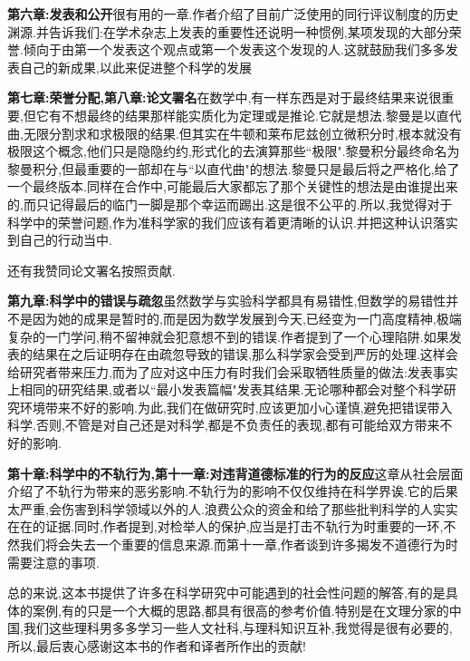 \documentclass[b5paper]{ctexart}
\begin{document}
\textbf{第六章:发表和公开}很有用的一章.作者介绍了目前广泛使用的同行评议制度的历史渊源.并告诉我们:在学术杂志上发表的重要性还说明一种惯例,某项发现的大部分荣誉.倾向于由第一个发表这个观点或第一个发表这个发现的人.这就鼓励我们多多发表自己的新成果,以此来促进整个科学的发展\par
\textbf{第七章:荣誉分配,第八章:论文署名}在数学中,有一样东西是对于最终结果来说很重要,但它有不想最终的结果那样能实质化为定理或是推论.它就是想法.黎曼是以直代曲,无限分割求和求极限的结果.但其实在牛顿和莱布尼兹创立微积分时,根本就没有极限这个概念,他们只是隐隐约约,形式化的去演算那些``极限".黎曼积分最终命名为黎曼积分,但最重要的一部却在与``以直代曲"的想法.黎曼只是最后将之严格化,给了一个最终版本.同样在合作中,可能最后大家都忘了那个关键性的想法是由谁提出来的,而只记得最后的临门一脚是那个幸运而踢出.这是很不公平的.所以,我觉得对于科学中的荣誉问题,作为准科学家的我们应该有着更清晰的认识.并把这种认识落实到自己的行动当中.\par
还有我赞同论文署名按照贡献.\par
\textbf{第九章:科学中的错误与疏忽}虽然数学与实验科学都具有易错性,但数学的易错性并不是因为她的成果是暂时的,而是因为数学发展到今天,已经变为一门高度精神,极端复杂的一门学问,稍不留神就会犯意想不到的错误.作者提到了一个心理陷阱.如果发表的结果在之后证明存在由疏忽导致的错误,那么科学家会受到严厉的处理.这样会给研究者带来压力,而为了应对这中压力有时我们会采取牺牲质量的做法:发表事实上相同的研究结果,或者以``最小发表篇幅"发表其结果.无论哪种都会对整个科学研究环境带来不好的影响.为此,我们在做研究时,应该更加小心谨慎,避免把错误带入科学.否则,不管是对自己还是对科学,都是不负责任的表现,都有可能给双方带来不好的影响.\par
\textbf{第十章:科学中的不轨行为,第十一章:对违背道德标准的行为的反应}这章从社会层面介绍了不轨行为带来的恶劣影响.不轨行为的影响不仅仅维持在科学界诶.它的后果太严重,会伤害到科学领域以外的人.浪费公众的资金和给了那些批判科学的人实实在在的证据.同时,作者提到,对检举人的保护,应当是打击不轨行为时重要的一环,不然我们将会失去一个重要的信息来源.而第十一章,作者谈到许多揭发不道德行为时需要注意的事项.\par
总的来说,这本书提供了许多在科学研究中可能遇到的社会性问题的解答,有的是具体的案例,有的只是一个大概的思路,都具有很高的参考价值.特别是在文理分家的中国,我们这些理科男多多学习一些人文社科,与理科知识互补,我觉得是很有必要的,所以,最后衷心感谢这本书的作者和译者所作出的贡献!
\end{document}
